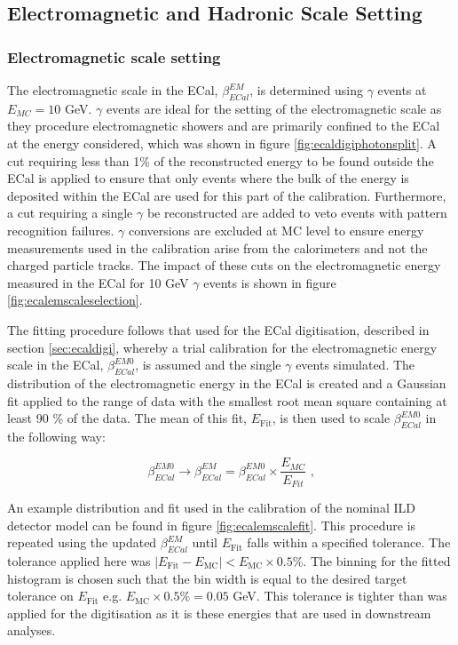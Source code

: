 \subsection{Electromagnetic and Hadronic Scale Setting}
\label{sec:scalesetting}


\subsubsection{Electromagnetic scale setting}
\label{sec:emscalesetting}
The electromagnetic scale in the ECal, $\beta^{EM}_{ECal}$, is determined using $\gamma$ events at $E_{MC} = 10$ GeV.  $\gamma$ events are ideal for the setting of the electromagnetic scale as they procedure electromagnetic showers and are primarily confined to the ECal at the energy considered, which was shown in figure \ref{fig:ecaldigiphotonsplit}.  A cut requiring less than 1\% of the reconstructed energy to be found outside the ECal is applied to ensure that only events where the bulk of the energy is deposited within the ECal are used for this part of the calibration.  Furthermore, a cut requiring a single $\gamma$ be reconstructed are added to veto events with pattern recognition failures.  $\gamma$ conversions are excluded at MC level to ensure energy measurements used in the calibration arise from the calorimeters and not the charged particle tracks.  The impact of these cuts on the electromagnetic energy measured in the ECal for 10 GeV $\gamma$ events is shown in figure \ref{fig:ecalemscaleselection}.   

The fitting procedure follows that used for the ECal digitisation, described in section \ref{sec:ecaldigi}, whereby a trial calibration for the electromagnetic energy scale in the ECal, $\beta^{EM0}_{ECal}$, is assumed and the single $\gamma$ events simulated.  The distribution of the electromagnetic energy in the ECal is created and a Gaussian fit applied to the range of data with the smallest root mean square containing at least 90 \% of the data.  The mean of this fit, $E_{\text{Fit}}$, is then used to scale $\beta^{EM0}_{ECal}$ in the following way:

\begin{equation}
\beta^{EM0}_{ECal} \rightarrow \beta^{EM}_{ECal} = \beta^{EM0}_{ECal} \times \frac{E_{MC}}{E_{Fit}}\text{ ,}
\end{equation}

An example distribution and fit used in the calibration of the nominal ILD detector model can be found in figure \ref{fig:ecalemscalefit}.  This procedure is repeated using the updated $\beta^{EM}_{ECal}$ until $E_{\text{Fit}}$ falls within a specified tolerance.  The tolerance applied here was $|E_{\text{Fit}} - E_{\text{MC}}| < E_{\text{MC}} \times 0.5 \%$.  The binning for the fitted histogram is chosen such that the bin width is equal to the desired target tolerance on $E_{\text{Fit}}$ e.g. $E_{\text{MC}} \times 0.5 \% = 0.05$ GeV.  This tolerance is tighter than was applied for the digitisation as it is these energies that are used in downstream analyses.   
 
